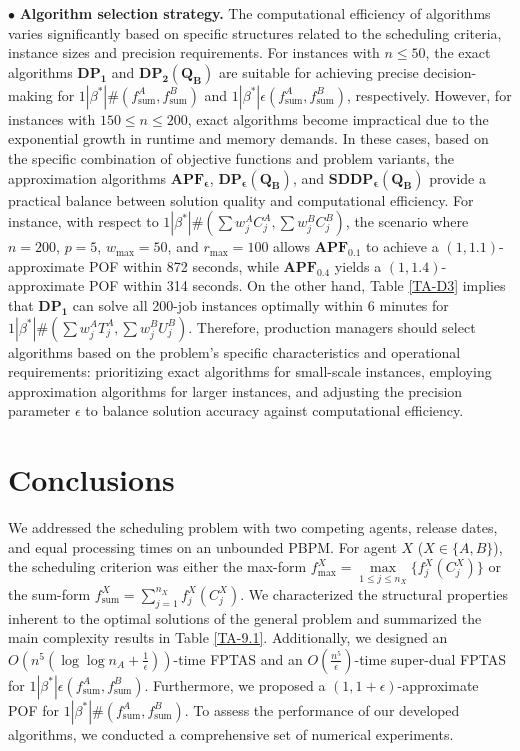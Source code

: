 \documentclass[12pt]{article}
\begin{document}
\begin{sloppypar}
$\bullet$ \textbf{Algorithm selection strategy.} The computational efficiency of algorithms varies significantly based on specific structures related to the scheduling criteria, instance sizes and precision requirements. For instances with $n \leq 50$, the exact algorithms $\mathbf{DP_1}$ and $\mathbf{DP_2(Q_B)}$ are suitable for achieving precise decision-making for $1 | \beta^{*}|\#(f_{\mathrm{sum}}^A, f_{\mathrm{sum}}^B)$ and $1 | \beta^{*}|\epsilon(f_{\mathrm{sum}}^A, f_{\mathrm{sum}}^B)$, respectively. However, for instances with $150 \leq n \leq 200$, exact algorithms become impractical due to the exponential growth in runtime and memory demands. In these cases, based on the specific combination of objective functions and problem variants, the approximation algorithms $\mathbf{APF_{\epsilon}}$, $\mathbf{DP_{\epsilon}(Q_B)}$, and $\mathbf{SDDP_{\epsilon}(Q_B)}$ provide a practical balance between solution quality and computational efficiency. For instance, with respect to $1 | \beta^{*}|\#(\sum w_j^A C_j^A, \sum w_j^B C_j^B)$, the scenario where $n=200$, $p=5$, $w_{\max}=50$, and $r_{\max}=100$ allows $\mathbf{APF_{0.1}}$ to achieve a $(1, 1.1)$-approximate POF within 872 seconds, while $\mathbf{APF_{0.4}}$ yields a $(1, 1.4)$-approximate POF within 314 seconds. On the other hand, Table \ref{TA-D3} implies that $\mathbf{DP_1}$ can solve all 200-job instances optimally within 6 minutes for $1 | \beta^{*}|\#(\sum w_j^A T_j^A, \sum w_j^B U_j^B)$. Therefore, production managers should
select algorithms based on the problem's specific characteristics and operational requirements: prioritizing exact
algorithms for small-scale instances, employing approximation algorithms for larger instances, and adjusting the precision parameter $\epsilon$ to balance solution accuracy against computational efficiency.

\section{Conclusions}
We addressed the scheduling problem with two competing agents, release dates, and equal processing times on an unbounded PBPM. For agent $X$ ($X \in \{A, B\}$), the scheduling criterion was either the max-form $f_{\max}^{X}=\max\limits_{1 \leq j \leq n_X}\{f_j^X(C_j^X)\}$ or the sum-form $f_{\mathrm{sum}}^{X}=\sum_{j=1}^{n_X}f_j^X(C_j^X)$. We characterized the structural properties inherent to the optimal solutions of the general problem and summarized the main complexity results in Table \ref{TA-9.1}. Additionally, we designed an $O(n^5 (\log \log n_A+ \frac{1}{\epsilon}))$-time FPTAS and an $O(\frac{n^5} {\epsilon})$-time super-dual FPTAS for $1 | \beta^{*}|\epsilon(f_{\mathrm{sum}}^A, f_{\mathrm{sum}}^B)$. Furthermore, we proposed a $(1, 1+\epsilon)$-approximate POF for $1 | \beta^{*}|\#(f_{\mathrm{sum}}^A, f_{\mathrm{sum}}^B)$. To assess the performance of our developed algorithms, we conducted a comprehensive set of numerical experiments.


\end{sloppypar}
\end{document}
